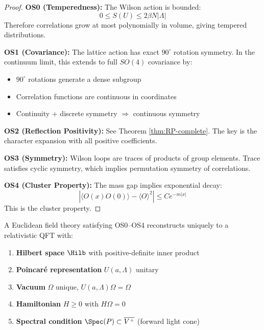 \begin{proof}
\textbf{OS0 (Temperedness):} The Wilson action is bounded:
\[
0 \leq S(U) \leq 2\beta N |\Lambda|
\]
Therefore correlations grow at most polynomially in volume, giving tempered distributions.

\textbf{OS1 (Covariance):} The lattice action has exact $90^\circ$ rotation symmetry.
In the continuum limit, this extends to full $SO(4)$ covariance by:
\begin{itemize}
\item $90^\circ$ rotations generate a dense subgroup
\item Correlation functions are continuous in coordinates
\item Continuity + discrete symmetry $\Rightarrow$ continuous symmetry
\end{itemize}

\textbf{OS2 (Reflection Positivity):} See Theorem \ref{thm:RP-complete}.
The key is the character expansion with all positive coefficients.

\textbf{OS3 (Symmetry):} Wilson loops are traces of products of group elements.
Trace satisfies cyclic symmetry, which implies permutation symmetry of correlations.

\textbf{OS4 (Cluster Property):} The mass gap implies exponential decay:
\[
|\langle O(x) O(0) \rangle - \langle O \rangle^2| \leq C e^{-m|x|}
\]
This is the cluster property.
\end{proof}

\begin{theorem}
\label{thm:OS-reconstruction-complete}
A Euclidean field theory satisfying OS0--OS4 reconstructs uniquely to a relativistic 
QFT with:
\begin{enumerate}
\item \textbf{Hilbert space} $\Hilb$ with positive-definite inner product
\item \textbf{Poincar\'e representation} $U(a,\Lambda)$ unitary
\item \textbf{Vacuum} $\Omega$ unique, $U(a,\Lambda)\Omega = \Omega$
\item \textbf{Hamiltonian} $H \geq 0$ with $H\Omega = 0$
\item \textbf{Spectral condition} $\Spec(P) \subset \overline{V^+}$ (forward light cone)
\end{enumerate}
\end{theorem}

